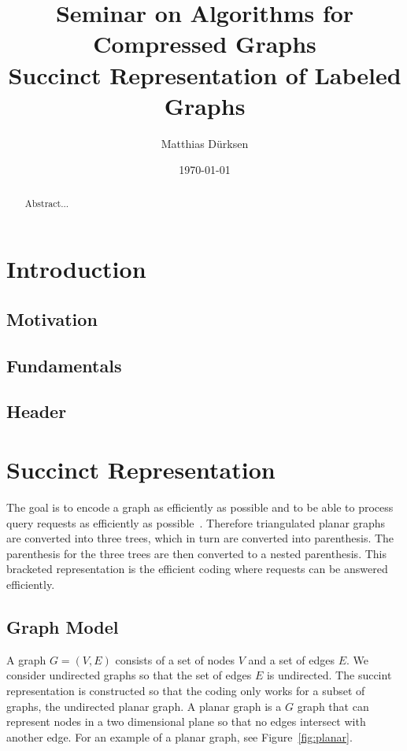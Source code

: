 \documentclass[a4paper]{scrartcl}
\title{Seminar on Algorithms for Compressed Graphs \\ Succinct Representation of Labeled Graphs}
\author{Matthias Dürksen}
\date{\today}
\begin{document}
\maketitle

\begin{abstract}
	Abstract...
\end{abstract}


\section{Introduction}\label{sec:introduction}

\subsection{Motivation}

\subsection{Fundamentals}

\subsection{Header}





\section{Succinct Representation}
The goal is to encode a graph as efficiently as possible and to be able to process query requests as efficiently as possible~\cite{SuccinctRepresentation}. Therefore triangulated planar graphs are converted into three trees, which in turn are converted into parenthesis. The parenthesis for the three trees are then converted to a nested parenthesis. This bracketed representation is the efficient coding where requests can be answered efficiently.





\subsection{Graph Model}
A graph $G=(V,E)$ consists of a set of nodes $V$ and a set of edges $E$. We consider undirected graphs so that the set of edges $E$ is undirected.
The succint representation is constructed so that the coding only works for a subset of graphs, the undirected planar graph. A planar graph is a $G$ graph that can represent nodes in a two dimensional plane so that no edges intersect with another edge. For an example of a planar graph, see Figure~\ref{fig:planar}.
\end{document}
